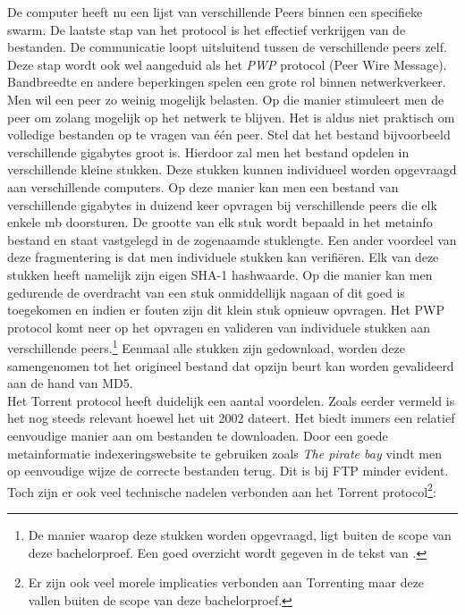 De computer heeft nu een lijst van verschillende Peers binnen een specifieke swarm. De laatste stap van het protocol is het effectief verkrijgen van de bestanden. De communicatie loopt uitsluitend tussen de verschillende peers zelf. Deze stap wordt ook wel aangeduid als het \textit{PWP} protocol (Peer Wire Message). Bandbreedte en andere beperkingen spelen een grote rol binnen netwerkverkeer. Men wil een peer zo weinig mogelijk belasten. Op die manier stimuleert men de peer om zolang mogelijk op het netwerk te blijven. Het is aldus niet praktisch om volledige bestanden op te vragen van één peer. Stel dat het bestand bijvoorbeeld verschillende gigabytes groot is. Hierdoor zal men het bestand opdelen in verschillende kleine stukken. Deze stukken kunnen individueel worden opgevraagd aan verschillende computers. Op deze manier kan men een bestand van verschillende gigabytes in duizend keer opvragen bij verschillende peers die elk enkele mb doorsturen. De grootte van elk stuk wordt bepaald in het metainfo bestand en staat vastgelegd in de zogenaamde stuklengte. Een ander voordeel van deze fragmentering is dat men individuele stukken kan verifiëren. Elk van deze stukken heeft namelijk zijn eigen SHA-1 hashwaarde. Op die manier kan men gedurende de overdracht van een stuk onmiddellijk nagaan of dit goed is toegekomen en indien er fouten zijn dit klein stuk opnieuw opvragen. Het PWP protocol komt neer op het opvragen en valideren van individuele stukken aan verschillende peers.\footnote{De manier waarop deze stukken worden opgevraagd, ligt buiten de scope van deze bachelorproef. Een goed overzicht wordt gegeven in de tekst van \textcite{Fonseca2005}.} Eenmaal alle stukken zijn gedownload, worden deze samengenomen tot het origineel bestand dat opzijn beurt kan worden gevalideerd aan de hand van MD5.\\

Het Torrent protocol heeft duidelijk een aantal voordelen. Zoals eerder vermeld is het nog steeds relevant hoewel het uit 2002 dateert. Het biedt immers een relatief eenvoudige manier aan om bestanden te downloaden. Door een goede metainformatie indexeringswebsite te gebruiken zoals \textit{The pirate bay} vindt men op eenvoudige wijze de correcte bestanden terug. Dit is bij FTP minder evident.\\

Toch zijn er ook veel technische nadelen verbonden aan het Torrent protocol\footnote{Er zijn ook veel morele implicaties verbonden aan Torrenting maar deze vallen buiten de scope van deze bachelorproef.}:

